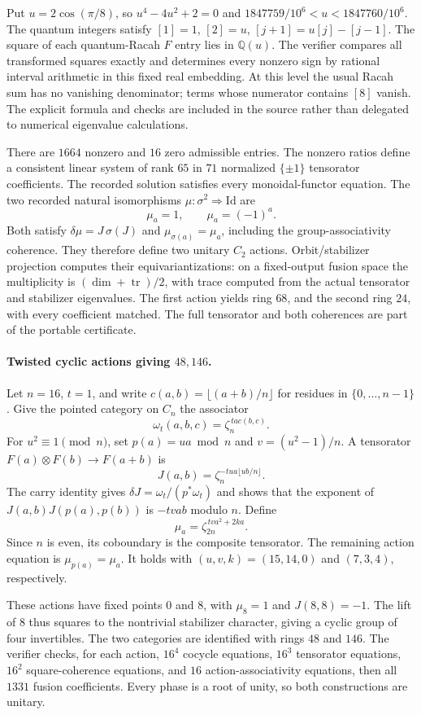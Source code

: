 \documentclass[11pt,a4paper]{article}
\begin{document}
Put $u=2\cos(\pi/8)$, so $u^4-4u^2+2=0$ and
$1847759/10^6<u<1847760/10^6$.  The quantum integers satisfy
$[1]=1$, $[2]=u$, $[j+1]=u[j]-[j-1]$.  The square of each quantum-Racah
$F$ entry lies in $\mathbb Q(u)$.  The verifier compares all transformed
squares exactly and determines every nonzero sign by rational interval
arithmetic in this fixed real embedding.  At this level the usual Racah
sum has no vanishing denominator; terms whose numerator contains
$[8]$ vanish.  The explicit formula and checks are included in the
source rather than delegated to numerical eigenvalue calculations.

There are $1664$ nonzero and $16$ zero admissible entries.  The nonzero
ratios define a consistent linear system of rank $65$ in $71$ normalized
$\{\pm1\}$ tensorator coefficients.  The recorded solution satisfies
every monoidal-functor equation.  The two recorded natural isomorphisms
$\mu:\sigma^2\Rightarrow\mathrm{Id}$ are
\[
 \mu_a=1,\qquad \mu_a=(-1)^a.
\]
Both satisfy $\delta\mu=J\,\sigma(J)$ and
$\mu_{\sigma(a)}=\mu_a$, including the group-associativity coherence.
They therefore define two unitary $C_2$ actions.  Orbit/stabilizer
projection computes their equivariantizations: on a fixed-output fusion
space the multiplicity is $(\dim+\operatorname{tr})/2$, with trace
computed from the actual tensorator and stabilizer eigenvalues.  The
first action yields ring $68$, and the second ring $24$, with every
coefficient matched.  The full tensorator and both coherences are
part of the portable certificate.

\paragraph{Twisted cyclic actions giving $48,146$.}
Let $n=16$, $t=1$, and write $c(a,b)=\lfloor(a+b)/n\rfloor$ for
residues in $\{0,\ldots,n-1\}$.  Give the pointed category on $C_n$
the associator
\[
 \omega_t(a,b,c)=\zeta_n^{\,t a c(b,c)}.
\]
For $u^2\equiv1\pmod n$, set $p(a)=ua\bmod n$ and
$v=(u^2-1)/n$.  A tensorator $F(a)\otimes F(b)\to F(a+b)$ is
\[
 J(a,b)=\zeta_n^{-tua\lfloor ub/n\rfloor}.
\]
The carry identity gives
$\delta J=\omega_t/(p^*\omega_t)$ and shows that the exponent of
$J(a,b)J(p(a),p(b))$ is $-tvab$ modulo $n$.  Define
\[
 \mu_a=\zeta_{2n}^{\,tv a^2+2ka}.
\]
Since $n$ is even, its coboundary is the composite tensorator.  The
remaining action equation is $\mu_{p(a)}=\mu_a$.  It holds with
$(u,v,k)=(15,14,0)$ and $(7,3,4)$, respectively.

These actions have fixed points $0$ and $8$, with $\mu_8=1$ and
$J(8,8)=-1$.  The lift of $8$ thus squares to the nontrivial stabilizer
character, giving a cyclic group of four invertibles.  The two
categories are identified with rings $48$ and $146$.  The verifier
checks, for each action, $16^4$ cocycle equations, $16^3$ tensorator
equations, $16^2$ square-coherence equations, and $16$ action-associativity
equations, then all $1331$ fusion coefficients.  Every phase is a root
of unity, so both constructions are unitary.
\end{document}

